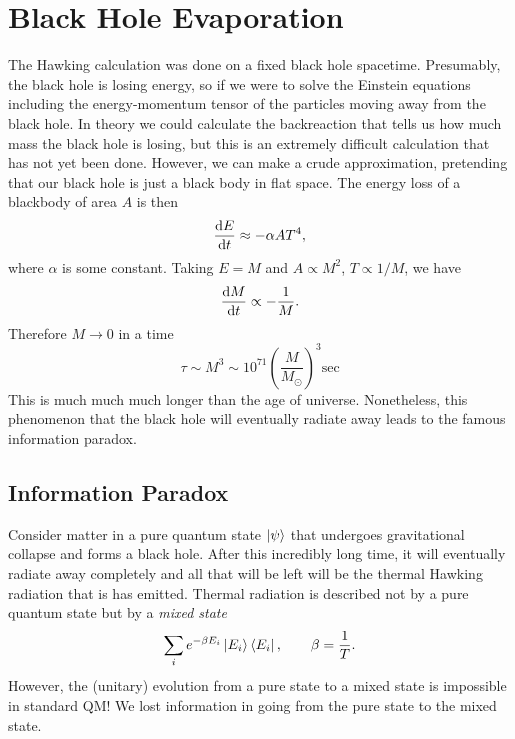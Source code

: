 \section{Black Hole Evaporation}%
\label{sec:black_hole_evaporation}

The Hawking calculation was done on a fixed black hole spacetime.
Presumably, the black hole is losing energy, so if we were to solve the Einstein equations including the energy-momentum tensor of the particles moving away from the black hole. In theory we could calculate the backreaction that tells us how much mass the black hole is losing, but this is an extremely difficult calculation that has not yet been done.
However, we can make a crude approximation, pretending that our black hole is just a black body in flat space. The energy loss of a blackbody of area $A$ is then
\begin{equation}
  \dv{E}{t} \approx - \alpha A T^4,
\end{equation}
where $\alpha$ is some constant. Taking $E = M$ and $A \propto M^2$, $T \propto 1  / M$, we have
\begin{equation}
  \dv{M}{t} \propto - \frac{1}{M}.
\end{equation}
Therefore $M \to 0$ in a time
\begin{equation}
  \tau \sim M^3 \sim 10^{71} \left( \frac{M}{M_\odot} \right)^3 \text{sec}
\end{equation}
This is much much much longer than the age of universe.
Nonetheless, this phenomenon that the black hole will eventually radiate away leads to the famous information paradox.

\subsection{Information Paradox}%
\label{sub:information_paradox}

Consider matter in a pure quantum state $\ket{\psi}$ that undergoes gravitational collapse and forms a black hole. After this incredibly long time, it will eventually radiate away completely and all that will be left will be the thermal Hawking radiation that is has emitted.
Thermal radiation is described not by a pure quantum state but by a \emph{mixed state}
\begin{equation}
  \sum_i e^{-\beta E_i} \ket{E_i} \bra{E_i}, \qquad \beta = \frac{1}{T}.
\end{equation}
However, the (unitary) evolution from a pure state to a mixed state is impossible in standard QM!
We lost information in going from the pure state to the mixed state.

